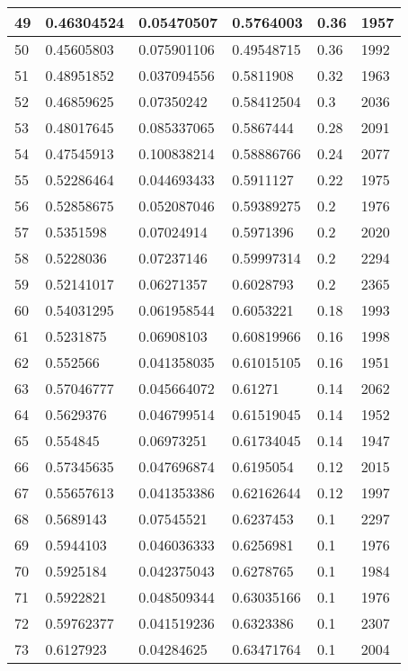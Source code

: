 \begin{longtable}{|l|l|l|l|l|l|}
49 & 0.46304524 & 0.05470507 & 0.5764003 & 0.36 & 1957 \\ \hline 
50 & 0.45605803 & 0.075901106 & 0.49548715 & 0.36 & 1992 \\ \hline 
51 & 0.48951852 & 0.037094556 & 0.5811908 & 0.32 & 1963 \\ \hline 
52 & 0.46859625 & 0.07350242 & 0.58412504 & 0.3 & 2036 \\ \hline 
53 & 0.48017645 & 0.085337065 & 0.5867444 & 0.28 & 2091 \\ \hline 
54 & 0.47545913 & 0.100838214 & 0.58886766 & 0.24 & 2077 \\ \hline 
55 & 0.52286464 & 0.044693433 & 0.5911127 & 0.22 & 1975 \\ \hline 
56 & 0.52858675 & 0.052087046 & 0.59389275 & 0.2 & 1976 \\ \hline 
57 & 0.5351598 & 0.07024914 & 0.5971396 & 0.2 & 2020 \\ \hline 
58 & 0.5228036 & 0.07237146 & 0.59997314 & 0.2 & 2294 \\ \hline 
59 & 0.52141017 & 0.06271357 & 0.6028793 & 0.2 & 2365 \\ \hline 
60 & 0.54031295 & 0.061958544 & 0.6053221 & 0.18 & 1993 \\ \hline 
61 & 0.5231875 & 0.06908103 & 0.60819966 & 0.16 & 1998 \\ \hline 
62 & 0.552566 & 0.041358035 & 0.61015105 & 0.16 & 1951 \\ \hline 
63 & 0.57046777 & 0.045664072 & 0.61271 & 0.14 & 2062 \\ \hline 
64 & 0.5629376 & 0.046799514 & 0.61519045 & 0.14 & 1952 \\ \hline 
65 & 0.554845 & 0.06973251 & 0.61734045 & 0.14 & 1947 \\ \hline 
66 & 0.57345635 & 0.047696874 & 0.6195054 & 0.12 & 2015 \\ \hline 
67 & 0.55657613 & 0.041353386 & 0.62162644 & 0.12 & 1997 \\ \hline 
68 & 0.5689143 & 0.07545521 & 0.6237453 & 0.1 & 2297 \\ \hline 
69 & 0.5944103 & 0.046036333 & 0.6256981 & 0.1 & 1976 \\ \hline 
70 & 0.5925184 & 0.042375043 & 0.6278765 & 0.1 & 1984 \\ \hline 
71 & 0.5922821 & 0.048509344 & 0.63035166 & 0.1 & 1976 \\ \hline 
72 & 0.59762377 & 0.041519236 & 0.6323386 & 0.1 & 2307 \\ \hline 
73 & 0.6127923 & 0.04284625 & 0.63471764 & 0.1 & 2004 \\ \hline 

\end{longtable}
